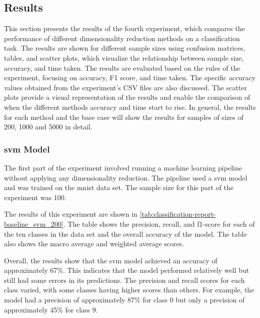 \subsection{Results}\label{subsec:experiment_4_results}
This section presents the results of the fourth experiment, which compares the performance of different dimensionality reduction methods on a classification task. The results are shown for different sample sizes using confusion matrices, tables, and scatter plots, which visualize the relationship between sample size, accuracy, and time taken. The results are evaluated based on the rules of the experiment, focusing on accuracy, F1 score, and time taken. The specific accuracy values obtained from the experiment's CSV files are also discussed. The scatter plots provide a visual representation of the results and enable the comparison of when the different methods accuracy and time start to rise. In general, the results for each method and the base case will show the results for samples of sizes of 200, 1000 and 5000 in detail.

\subsubsection{\gls{svm} Model}\label{subsubsec:experiment_4_no_dimmensionality_reduction}





The first part of the experiment involved running a machine learning pipeline without applying any dimensionality reduction. The pipeline used a \gls{svm} model and was trained on the \gls{mnist} data set. The sample size for this part of the experiment was 100.

The results of this experiment are shown in \ref{tab:classification-report-baseline_svm_200}. The table shows the precision, recall, and f1-score for each of the ten classes in the data set and the overall accuracy of the model. The table also shows the macro average and weighted average scores.

Overall, the results show that the \gls{svm} model achieved an accuracy of approximately 67\%. This indicates that the model performed relatively well but still had some errors in its predictions. The precision and recall scores for each class varied, with some classes having higher scores than others. For example, the model had a precision of approximately 87\% for class 0 but only a precision of approximately 45\% for class 9. 

